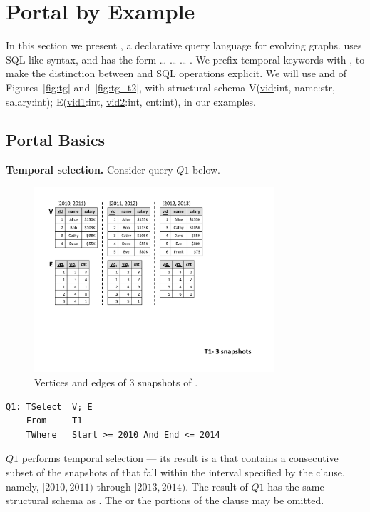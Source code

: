 \section{Portal by Example}
\label{sec:example}

In this section we present \ql, a declarative query language for
evolving graphs. \ql uses SQL-like syntax, and has the form
 \ldots {} \ldots {} \ldots
{}.  We prefix temporal keywords with , to make
the distinction between \ql and SQL operations explicit.  We will use
\tgs {} and  of Figures~\ref{fig:tg}
and~\ref{fig:tg_t2}, with structural schema V(\underline{vid}:int,
name:str, salary:int); E(\underline{vid1}:int, \underline{vid2}:int,
cnt:int), in our examples.

\subsection{Portal Basics}
\label{sec:example:basics}

{\bf Temporal selection.}  Consider query $Q1$ below.  

\begin{figure}
\includegraphics[width=3.5in]{figs/3VE.pdf}
\caption{Vertices and edges of 3 snapshots of .}
\label{fig:3ve}
\end{figure}

\begin{small}
\begin{verbatim}
Q1: TSelect  V; E
    From     T1
    TWhere   Start >= 2010 And End <= 2014
\end{verbatim}
\end{small}

$Q1$ performs temporal selection --- its result is a \tg that contains
a consecutive subset of the snapshots of  that fall within
the interval specified by the  clause, namely, $[2010,
  2011)$ through $[2013, 2014)$.  The result of $Q1$ has the same
    structural schema as . The  or the
     portions of the  clause may be omitted.


